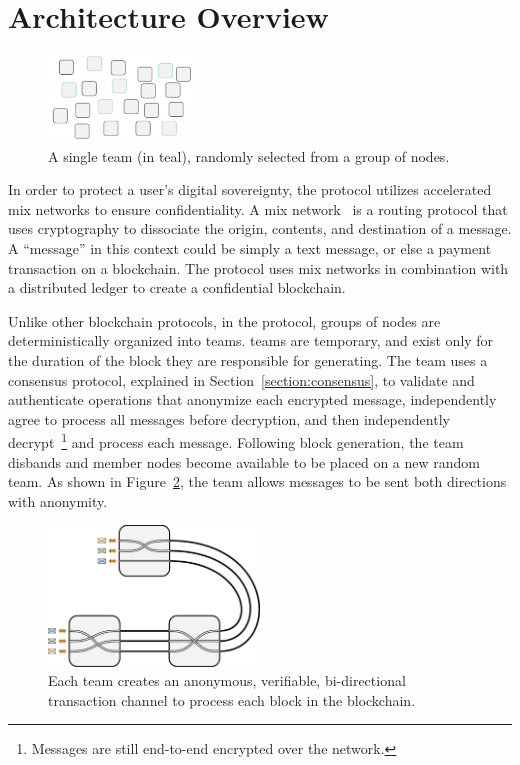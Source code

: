 \section{Architecture Overview}
\label{section:architecture}

\begin{figure}
    \centering
    \includegraphics[width=0.35\textwidth]{img/cohort.pdf}
    \caption{A single team (in teal), randomly selected from a group of nodes.}
    \label{fig:team}
\end{figure}

In order to protect a user's digital sovereignty, the \name protocol utilizes accelerated mix networks to ensure confidentiality. A mix network~\cite{mix_81} is a routing protocol that uses cryptography to dissociate the origin, contents, and destination of a message. A ``message'' in this context could be simply a text message, or else a payment transaction on a blockchain. The \name protocol uses mix networks in combination with a distributed ledger to create a confidential blockchain. 

Unlike other blockchain protocols, in the \name protocol, groups of nodes are deterministically organized into teams. \name teams are temporary, and exist only for the duration of the block they are responsible for generating. The team uses a consensus protocol, explained in Section~\ref{section:consensus}, to validate and authenticate operations that anonymize each encrypted message, independently agree to process all messages before decryption, and then independently decrypt~\footnote{Messages are still end-to-end encrypted over the network.} and process each message. Following block generation, the team disbands and member nodes become available to be placed on a new random team. As shown in Figure~\ref{figure:simple-architecture}, the team allows messages to be sent both directions with anonymity. 

\begin{figure}
    \centering
    \includegraphics[width=0.5\textwidth]{img/Simple-Architecture.pdf}
    \caption{Each team creates an anonymous, verifiable, bi-directional transaction channel to process each block in the blockchain.}
    \label{figure:simple-architecture}
\end{figure}


